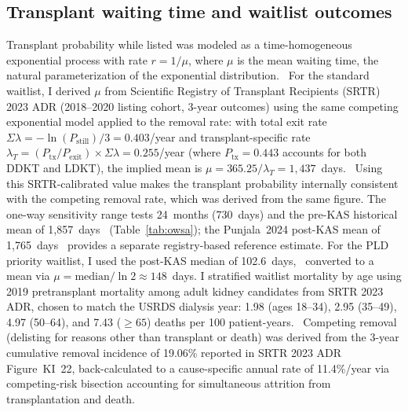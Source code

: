 
\subsection{Transplant waiting time and waitlist outcomes}
Transplant probability while listed was modeled as a time-homogeneous exponential process with rate $r = 1/\mu$, where $\mu$ is the mean waiting time, the natural parameterization of the exponential distribution.~\cite{sonnenberg1993} For the standard waitlist, I derived $\mu$ from Scientific Registry of Transplant Recipients (SRTR) 2023 ADR (2018--2020 listing cohort, 3-year outcomes) using the same competing exponential model applied to the removal rate: with total exit rate $\Sigma\lambda = -\ln(P_{\text{still}})/3 = 0.403$/year and transplant-specific rate $\lambda_T = (P_{\text{tx}}/P_{\text{exit}}) \times \Sigma\lambda = 0.255$/year (where $P_{\text{tx}} = 0.443$ accounts for both DDKT and LDKT), the implied mean is $\mu = 365.25/\lambda_T = 1{,}437$~days.~\cite{srtr_2023} Using this SRTR-calibrated value makes the transplant probability internally consistent with the competing removal rate, which was derived from the same figure. The one-way sensitivity range tests 24~months (730~days) and the pre-KAS historical mean of 1{,}857~days~\cite{punjala_determinants_2024} (Table~\ref{tab:owsa}); the Punjala~2024 post-KAS mean of 1{,}765~days~\cite{punjala_determinants_2024} provides a separate registry-based reference estimate. For the PLD priority waitlist, I used the post-KAS median of 102.6~days,~\cite{wainright_impact_2017} converted to a mean via $\mu = \text{median}/\ln 2 \approx 148$~days. I stratified waitlist mortality by age using 2019 pretransplant mortality among adult kidney candidates from SRTR 2023 ADR, chosen to match the USRDS dialysis year: 1.98 (ages 18--34), 2.95 (35--49), 4.97 (50--64), and 7.43 ($\geq 65$) deaths per 100 patient-years.~\cite{srtr_2023} Competing removal (delisting for reasons other than transplant or death) was derived from the 3-year cumulative removal incidence of 19.06\% reported in SRTR 2023 ADR Figure~KI~22, back-calculated to a cause-specific annual rate of 11.4\%/year via competing-risk bisection accounting for simultaneous attrition from transplantation and death.~\cite{srtr_2023}

